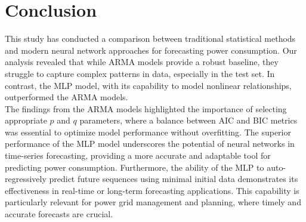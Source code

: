 \documentclass{article}
\begin{document}
\section{Conclusion}
This study has conducted a comparison between traditional statistical methods and modern neural network approaches for forecasting power consumption. Our analysis revealed that while ARMA models provide a robust baseline, they struggle to capture complex patterns in data, especially in the test set. In contrast, the MLP model, with its capability to model nonlinear relationships, outperformed the ARMA models.\\
The findings from the ARMA models highlighted the importance of selecting appropriate \(p\) and \(q\) parameters, where a balance between AIC and BIC metrics was essential to optimize model performance without overfitting. The superior performance of the MLP model underscores the potential of neural networks in time-series forecasting, providing a more accurate and adaptable tool for predicting power consumption.
Furthermore, the ability of the MLP to auto-regressively predict future sequences using minimal initial data demonstrates its effectiveness in real-time or long-term forecasting applications. This capability is particularly relevant for power grid management and planning, where timely and accurate forecasts are crucial.

\printbibliography %
\end{document}
